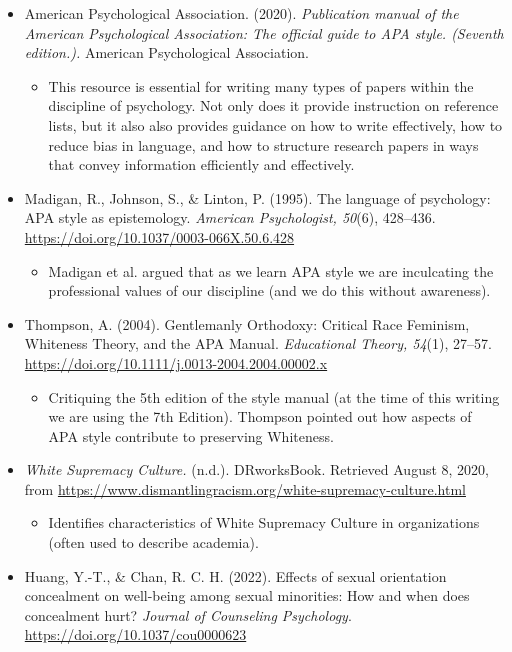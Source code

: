 \documentclass[
  11pt,
]{book}
\providecommand{\tightlist}{%
  \setlength{\itemsep}{0pt}\setlength{\parskip}{0pt}}
\begin{document}
\begin{itemize}
\tightlist
\item
  American Psychological Association. (2020). \emph{Publication manual of the American Psychological Association: The official guide to APA style. (Seventh edition.).} American Psychological Association.

  \begin{itemize}
  \tightlist
  \item
    This resource is essential for writing many types of papers within the discipline of psychology. Not only does it provide instruction on reference lists, but it also also provides guidance on how to write effectively, how to reduce bias in language, and how to structure research papers in ways that convey information efficiently and effectively.
  \end{itemize}
\item
  Madigan, R., Johnson, S., \& Linton, P. (1995). The language of psychology: APA style as epistemology. \emph{American Psychologist, 50}(6), 428--436. \url{https://doi.org/10.1037/0003-066X.50.6.428}

  \begin{itemize}
  \tightlist
  \item
    Madigan et al. \citeyearpar{madigan_language_1995} argued that as we learn APA style we are inculcating the professional values of our discipline (and we do this without awareness).
  \end{itemize}
\item
  Thompson, A. (2004). Gentlemanly Orthodoxy: Critical Race Feminism, Whiteness Theory, and the APA Manual. \emph{Educational Theory, 54}(1), 27--57. \url{https://doi.org/10.1111/j.0013-2004.2004.00002.x}

  \begin{itemize}
  \tightlist
  \item
    Critiquing the 5th edition of the style manual (at the time of this writing we are using the 7th Edition). Thompson \citeyearpar{thompson_gentlemanly_2004} pointed out how aspects of APA style contribute to preserving Whiteness.
  \end{itemize}
\item
  \emph{White Supremacy Culture.} (n.d.). DRworksBook. Retrieved August 8, 2020, from \url{https://www.dismantlingracism.org/white-supremacy-culture.html}

  \begin{itemize}
  \tightlist
  \item
    Identifies characteristics of White Supremacy Culture in organizations (often used to describe academia).
  \end{itemize}
\item
  Huang, Y.-T., \& Chan, R. C. H. (2022). Effects of sexual orientation concealment on well-being among sexual minorities: How and when does concealment hurt? \emph{Journal of Counseling Psychology}. \url{https://doi.org/10.1037/cou0000623}


\end{itemize}
\end{document}

